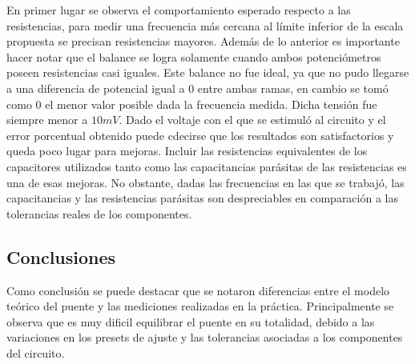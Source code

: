 En primer lugar se observa el comportamiento esperado respecto a las resistencias, para medir una frecuencia más cercana al límite inferior de la escala propuesta se precisan resistencias mayores. Además de lo anterior es importante hacer notar que el balance se logra solamente cuando ambos potenciómetros poseen resistencias casi iguales. Este balance no fue ideal, ya que no pudo llegarse a una diferencia de potencial igual a 0 entre ambas ramas, en cambio se tomó como $0$ el menor valor posible dada la frecuencia medida. Dicha tensión fue siempre menor a $10mV$. Dado el voltaje con el que se estimuló al circuito y el error porcentual obtenido  puede cdecirse que los resultados son satisfactorios y queda poco lugar para mejoras. Incluir las resistencias equivalentes de los capacitores utilizados tanto como las capacitancias parásitas de las resistencias es una de esas mejoras. No obstante, dadas las frecuencias en las que se trabajó, las capacitancias y las resistencias parásitas son despreciables en comparación a las tolerancias reales de los componentes. 




\subsection{Conclusiones}

Como conclusi\'on se puede destacar que se notaron diferencias entre el modelo te\'orico del puente y las mediciones realizadas en la pr\'actica. Principalmente se observa que es muy dificil equilibrar el puente en su totalidad, debido a las variaciones en los presets de ajuste y las tolerancias asociadas a los componentes del circuito.